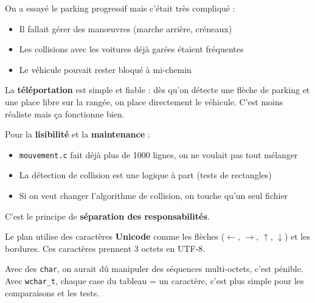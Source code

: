 \documentclass[11pt,a4paper]{article}
\newcommand{\keyword}[1]{\textcolor{primary}{\textbf{#1}}}
\newcommand{\code}[1]{\texttt{\textcolor{accent}{#1}}}
\begin{document}
\begin{reponsebox}
On a essayé le parking progressif mais c'était très compliqué :
\begin{itemize}[noitemsep]
    \item Il fallait gérer des manœuvres (marche arrière, créneaux)
    \item Les collisions avec les voitures déjà garées étaient fréquentes
    \item Le véhicule pouvait rester bloqué à mi-chemin
\end{itemize}
La \keyword{téléportation} est simple et fiable : dès qu'on détecte une flèche de parking et une place libre sur la rangée, on place directement le véhicule. C'est moins réaliste mais ça fonctionne bien.
\end{reponsebox}

\vspace{0.3cm}

\begin{questionbox}
\end{questionbox}

\begin{reponsebox}
Pour la \keyword{lisibilité} et la \keyword{maintenance} :
\begin{itemize}[noitemsep]
    \item \code{mouvement.c} fait déjà plus de 1000 lignes, on ne voulait pas tout mélanger
    \item La détection de collision est une logique à part (tests de rectangles)
    \item Si on veut changer l'algorithme de collision, on touche qu'un seul fichier
\end{itemize}
C'est le principe de \keyword{séparation des responsabilités}.
\end{reponsebox}

\vspace{0.3cm}

\begin{questionbox}
\end{questionbox}

\begin{reponsebox}
Le plan utilise des caractères \keyword{Unicode} comme les flèches ($\leftarrow$, $\rightarrow$, $\uparrow$, $\downarrow$) et les bordures. Ces caractères prennent 3 octets en UTF-8.

Avec des \code{char}, on aurait dû manipuler des séquences multi-octets, c'est pénible. Avec \code{wchar\_t}, chaque case du tableau = un caractère, c'est plus simple pour les comparaisons et les tests.
\end{reponsebox}
\end{document}
